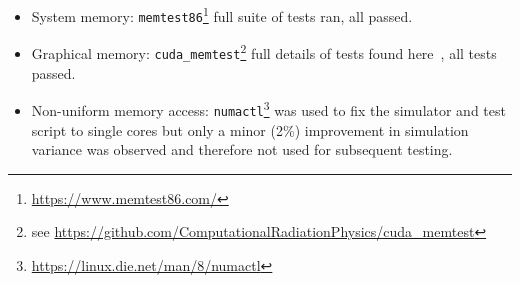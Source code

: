 \documentclass[letterpaper, 10 pt, journal, twoside]{IEEEtran}
\begin{document}
\begin{itemize}[leftmargin=*]
    \item System memory: \texttt{memtest86}\footnote{\url{https://www.memtest86.com/}} full suite of tests ran, all passed.
    \item Graphical memory: \texttt{cuda\_memtest}\footnote{see \url{https://github.com/ComputationalRadiationPhysics/cuda_memtest}} full details of tests found here~\cite{shi2009testing}, all tests passed.
    \item Non-uniform memory access: \texttt{numactl}\footnote{\url{https://linux.die.net/man/8/numactl}} was used to fix the simulator and test script to single cores but only a minor (2\%) improvement in simulation variance was observed and therefore not used for subsequent testing.
\end{itemize}





\end{document}
